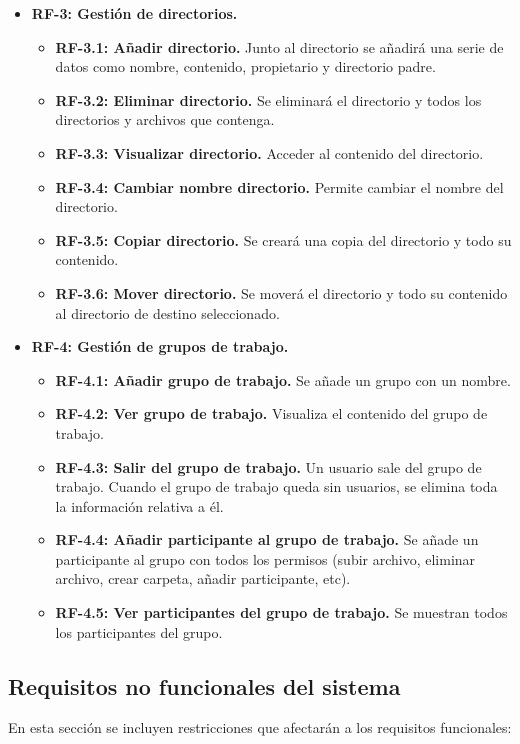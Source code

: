 \begin{itemize}
	\item \textbf{RF-3: Gestión de directorios.}
	\begin{itemize}
		\item \textbf{RF-3.1: Añadir directorio.} Junto al directorio se añadirá una serie de datos como nombre, contenido, propietario y directorio padre.
		\item \textbf{RF-3.2: Eliminar directorio.} Se eliminará el directorio y todos los directorios y archivos que contenga.
		\item \textbf{RF-3.3: Visualizar directorio.} Acceder al contenido del directorio.
		\item \textbf{RF-3.4: Cambiar nombre directorio.} Permite cambiar el nombre del directorio.
		\item \textbf{RF-3.5: Copiar directorio.} Se creará una copia del directorio y todo su contenido.
		\item \textbf{RF-3.6: Mover directorio.} Se moverá el directorio y todo su contenido al directorio de destino seleccionado.
	\end{itemize}
	
	\item \textbf{RF-4: Gestión de grupos de trabajo.}
	\begin{itemize}
		\item \textbf{RF-4.1: Añadir grupo de trabajo.} Se añade un grupo con un nombre.
		\item \textbf{RF-4.2: Ver grupo de trabajo.} Visualiza el contenido del grupo de trabajo.
		\item \textbf{RF-4.3: Salir del grupo de trabajo.} Un usuario sale del grupo de trabajo. Cuando el grupo de trabajo queda sin usuarios, se elimina toda la información relativa a él.
		\item \textbf{RF-4.4: Añadir participante al grupo de trabajo.} Se añade un participante al grupo con todos los permisos (subir archivo, eliminar archivo, crear carpeta, añadir participante, etc).
		\item \textbf{RF-4.5: Ver participantes del grupo de trabajo.} Se muestran todos los participantes del grupo.
	\end{itemize}
\end{itemize}

\subsection{Requisitos no funcionales del sistema}
En esta sección se incluyen restricciones que afectarán a los requisitos funcionales:

